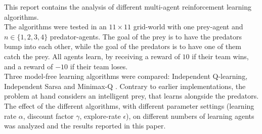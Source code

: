 This report contains the analysis of different multi-agent reinforcement learning algorithms. \\
The algorithms were tested in an $11\times11$ grid-world with one prey-agent and $n\in \{1,2,3,4\}$ predator-agents. The goal of the prey is to have the predators bump into each other, while the goal of the predators is to have one of them catch the prey. All agents learn, by receiving a reward of $10$ if their team wins, and a reward of $-10$ if their team loses. \\
Three model-free learning algorithms were compared: Independent Q-learning, Independent Sarsa and Minimax-Q \cite{Littman94markovgames}. Contrary to earlier implementations, the problem at hand considers an intelligent prey, that learns alongside the predators. The effect of the different algorithms, with different parameter settings (learning rate $\alpha$, discount factor $\gamma$, explore-rate $\epsilon$), on different numbers of learning agents was analyzed and the results reported in this paper.